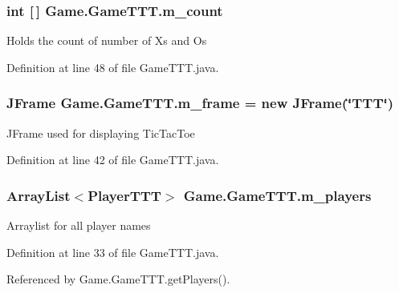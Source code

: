 \subsubsection[{m\+\_\+count}]{\setlength{\rightskip}{0pt plus 5cm}int \mbox{[}$\,$\mbox{]} Game.\+Game\+T\+T\+T.\+m\+\_\+count\hspace{0.3cm}{\ttfamily [private]}}\label{class_game_1_1_game_t_t_t_a79f50cdad0e0978bb30ac4ba2a96a971}
Holds the count of number of X\textquotesingle{}s and O\textquotesingle{}s 

Definition at line 48 of file Game\+T\+T\+T.\+java.

\hypertarget{class_game_1_1_game_t_t_t_a1ddfe813d586411f16504069d6bddf5d}{}
\subsubsection[{m\+\_\+frame}]{\setlength{\rightskip}{0pt plus 5cm}J\+Frame Game.\+Game\+T\+T\+T.\+m\+\_\+frame = new J\+Frame(\char`\"{}T\+T\+T\char`\"{})\hspace{0.3cm}{\ttfamily [private]}}\label{class_game_1_1_game_t_t_t_a1ddfe813d586411f16504069d6bddf5d}
J\+Frame used for displaying Tic\+Tac\+Toe 

Definition at line 42 of file Game\+T\+T\+T.\+java.

\hypertarget{class_game_1_1_game_t_t_t_aad75ff74595b7b58542d7060a77ca169}{}
\subsubsection[{m\+\_\+players}]{\setlength{\rightskip}{0pt plus 5cm}Array\+List$<${\bf Player\+T\+T\+T}$>$ Game.\+Game\+T\+T\+T.\+m\+\_\+players\hspace{0.3cm}{\ttfamily [private]}}\label{class_game_1_1_game_t_t_t_aad75ff74595b7b58542d7060a77ca169}
Arraylist for all player names 

Definition at line 33 of file Game\+T\+T\+T.\+java.



Referenced by Game.\+Game\+T\+T\+T.\+get\+Players().

\hypertarget{class_game_1_1_game_t_t_t_a6b2de64f05009047dd3a01867da865c0}{}
